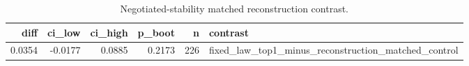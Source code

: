 \begin{table}[t]
\centering
\caption{Negotiated-stability matched reconstruction contrast.}
\label{tab:jun15_phase_matched}
\footnotesize
\begin{tabular}{rrrrrl}
\toprule
diff & ci\_low & ci\_high & p\_boot & n & contrast \\
\midrule
0.0354 & -0.0177 & 0.0885 & 0.2173 & 226 & fixed\_law\_top1\_minus\_reconstruction\_matched\_control \\
\bottomrule
\end{tabular}

\end{table}